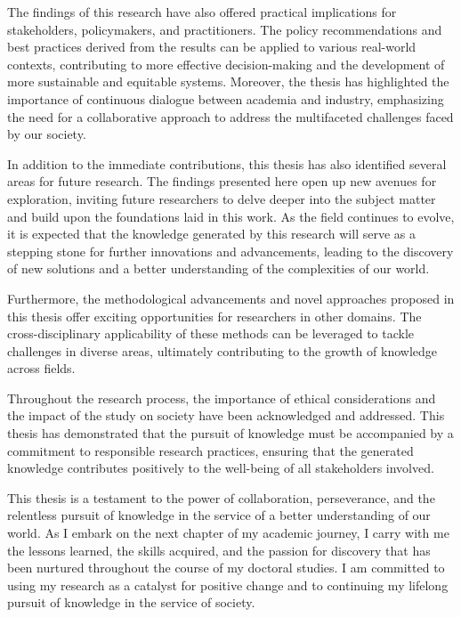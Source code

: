 \documentclass[./dissertation.tex]{subfiles}
\begin{document}
The findings of this research have also offered practical implications for stakeholders, policymakers, and practitioners. The policy recommendations and best practices derived from the results can be applied to various real-world contexts, contributing to more effective decision-making and the development of more sustainable and equitable systems. Moreover, the thesis has highlighted the importance of continuous dialogue between academia and industry, emphasizing the need for a collaborative approach to address the multifaceted challenges faced by our society.

In addition to the immediate contributions, this thesis has also identified several areas for future research. The findings presented here open up new avenues for exploration, inviting future researchers to delve deeper into the subject matter and build upon the foundations laid in this work. As the field continues to evolve, it is expected that the knowledge generated by this research will serve as a stepping stone for further innovations and advancements, leading to the discovery of new solutions and a better understanding of the complexities of our world.

Furthermore, the methodological advancements and novel approaches proposed in this thesis offer exciting opportunities for researchers in other domains. The cross-disciplinary applicability of these methods can be leveraged to tackle challenges in diverse areas, ultimately contributing to the growth of knowledge across fields.

Throughout the research process, the importance of ethical considerations and the impact of the study on society have been acknowledged and addressed. This thesis has demonstrated that the pursuit of knowledge must be accompanied by a commitment to responsible research practices, ensuring that the generated knowledge contributes positively to the well-being of all stakeholders involved.


This thesis is a testament to the power of collaboration, perseverance, and the relentless pursuit of knowledge in the service of a better understanding of our world. As I embark on the next chapter of my academic journey, I carry with me the lessons learned, the skills acquired, and the passion for discovery that has been nurtured throughout the course of my doctoral studies. I am committed to using my research as a catalyst for positive change and to continuing my lifelong pursuit of knowledge in the service of society.
\end{document}
